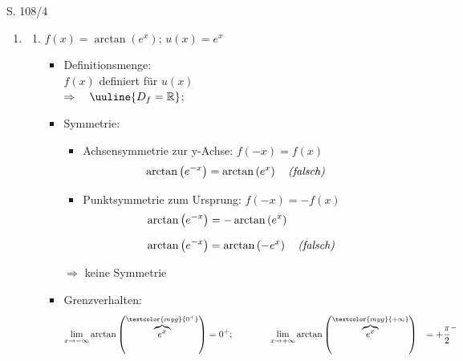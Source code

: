 \begin{Exercise}{S. 108/4}{}
\begin{enumerate}
    \item [4.]\begin{enumerate}[label=\alph*),leftmargin=*]
        \item[g)] {
            $f(x) = \arctan\left(e^{x}\right)$; \qquad $u(x) = e^{x}$ \\[-2.0ex]
            \begin{itemize}[leftmargin=*]
                \item Definitionsmenge: \\[1.0ex]{
                    $f(x)$ definiert für $u(x)$\\[1.0ex]
                    $\Rightarrow \quad \uuline{D_{f} = \mathbb{R}}$;
                    }
                \item Symmetrie: \\[-2.0ex]{
                    \begin{itemize}
                        \item Achsensymmetrie zur y-Achse: \quad $f(-x) = f(x)$\\[-2.0ex]{
                            \begin{align*}
                                \arctan\left(e^{-x}\right) &= \arctan\left(e^{x}\right) \quad \text{\textit{(falsch)}} &&
                            \end{align*}
                            }
                        \item Punktsymmetrie zum Ursprung: \quad $f(-x) = -f(x)$\\[-2.0ex]{
                            \begin{align*}
                                \arctan\left(e^{-x}\right) &= -\arctan\left(e^{x}\right) && \\[1.5ex]
                                \arctan\left(e^{-x}\right) &= \arctan\left(-e^{x}\right) \quad \text{\textit{(falsch)}} &&
                            \end{align*}
                            }
                    \end{itemize}
                    $\Rightarrow$ \quad keine Symmetrie\\[-2.0ex]
                    }
                \item Grenzverhalten: \\[-3.0ex]{
                    \begin{align*}
                        \lim\limits_{x \to -\infty} \arctan\left(\overbrace{e^{x}}^{\textcolor{myg}{0^{+}}}\right) &= 0^{+}; \qquad \qquad \lim\limits_{x \to +\infty} \arctan\left(\overbrace{e^{x}}^{\textcolor{myg}{+\infty}}\right) &= + {\dfrac{\pi}{2}}^{-} &&\\[-3.0ex]

\end{align*}}
\end{itemize}}
\end{enumerate}
\end{enumerate}
\end{Exercise}
